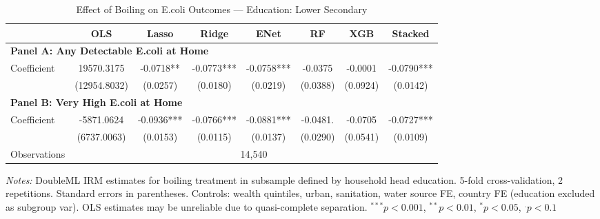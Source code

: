 \begin{table}[htbp]
\centering
\caption{Effect of Boiling on E.coli Outcomes --- Education: Lower Secondary}
\label{tab:cate_edu2}
\begin{tabular}{lccccccc}
\toprule
 & OLS & Lasso & Ridge & ENet & RF & XGB & Stacked \\
\midrule
\multicolumn{8}{l}{\textbf{Panel A: Any Detectable E.coli at Home}} \\
\midrule
Coefficient & 19570.3175 & -0.0718** & -0.0773*** & -0.0758*** & -0.0375 & -0.0001 & -0.0790*** \\
 & (12954.8032) & (0.0257) & (0.0180) & (0.0219) & (0.0388) & (0.0924) & (0.0142) \\

\multicolumn{8}{l}{\textbf{Panel B: Very High E.coli at Home}} \\
\midrule
Coefficient & -5871.0624 & -0.0936*** & -0.0766*** & -0.0881*** & -0.0481. & -0.0705 & -0.0727*** \\
 & (6737.0063) & (0.0153) & (0.0115) & (0.0137) & (0.0290) & (0.0541) & (0.0109) \\

\midrule
Observations & \multicolumn{7}{c}{14,540} \\
\bottomrule
\end{tabular}
\begin{minipage}{\textwidth}
\footnotesize
\textit{Notes:} DoubleML IRM estimates for boiling treatment in subsample defined by household head education. 
5-fold cross-validation, 2 repetitions. Standard errors in parentheses. 
Controls: wealth quintiles, urban, sanitation, water source FE, country FE (education excluded as subgroup var). 
OLS estimates may be unreliable due to quasi-complete separation. 
$^{***}p<0.001$, $^{**}p<0.01$, $^{*}p<0.05$, $^{.}p<0.1$
\end{minipage}
\end{table}
